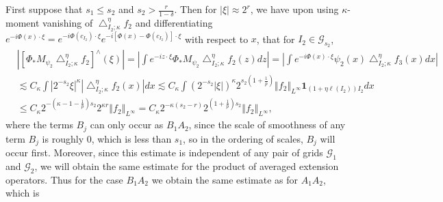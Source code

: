 \documentclass{amsart}%
\theoremstyle{plain}
\numberwithin{equation}{section}
\begin{document}
First suppose that $s_{1}\leq s_{2}$ and $s_{2}>\frac{r}{1-\delta}$. Then for
$\left\vert \xi\right\vert \approx2^{r}$, we have upon using $\kappa$-moment
vanishing of $\bigtriangleup_{I_{2};\kappa}^{\eta}f_{2}$ and differentiating
$e^{-i\Phi\left(  x\right)  \cdot\xi}=e^{-i\Phi\left(  c_{I_{2}}\right)
\cdot\xi}e^{-i\left[  \Phi\left(  x\right)  -\Phi\left(  c_{I_{2}}\right)
\right]  \cdot\xi}$ with respect to $x$, that for $I_{2}\in\mathcal{G}_{s_{2}%
}$,
\begin{align*}
& \left\vert \left[  \Phi_{\ast}M_{\psi_{2}}\bigtriangleup_{I_{2};\kappa
}^{\eta}f_{2}\right]  ^{\wedge}\left(  \xi\right)  \right\vert =\left\vert
\int e^{-iz\cdot\xi}\Phi_{\ast}M_{\psi_{2}}\bigtriangleup_{I_{2};\kappa}%
^{\eta}f_{2}\left(  z\right)  dz\right\vert =\left\vert \int e^{-i\Phi\left(
x\right)  \cdot\xi}\psi_{2}\left(  x\right)  \bigtriangleup_{I_{2};\kappa
}^{\eta}f_{3}\left(  x\right)  dx\right\vert \\
& \lesssim C_{\kappa}\int\left\vert 2^{-s_{2}}\xi\right\vert ^{\kappa
}\left\vert \bigtriangleup_{I_{2};\kappa}^{\eta}f_{2}\left(  x\right)
\right\vert dx\lesssim C_{\kappa}\int\left(  2^{-s_{2}}\left\vert
\xi\right\vert \right)  ^{\kappa}2^{s_{2}\left(  1+\frac{1}{p}\right)
}\left\Vert f_{2}\right\Vert _{L^{\infty}}\mathbf{1}_{\left(  1+\eta
\ell\left(  I_{2}\right)  \right)  I_{2}}dx\\
& \leq C_{\kappa}2^{-\left(  \kappa-1-\frac{1}{p}\right)  s_{2}}2^{\kappa
r}\left\Vert f_{2}\right\Vert _{L^{\infty}}=C_{\kappa}2^{-\kappa\left(
s_{2}-r\right)  }2^{\left(  1+\frac{1}{p}\right)  s_{2}}\left\Vert
f_{2}\right\Vert _{L^{\infty}},
\end{align*}
where the terms $B_{j}$ can only occur as $B_{1}A_{2}$, since the scale of
smoothness of any term $B_{j}$ is roughly $0$, which is less than $s_{1}$, so
in the ordering of scales, $B_{j}$ will occur first. Moreover, since this
estimate is independent of any pair of grids $\mathcal{G}_{1}$ and
$\mathcal{G}_{2}$, we will obtain the same estimate for the product of
averaged extension operators. Thus for the case $B_{1}A_{2}$ we obtain the
same estimate as for $A_{1}A_{2}$, which is
\end{document}
